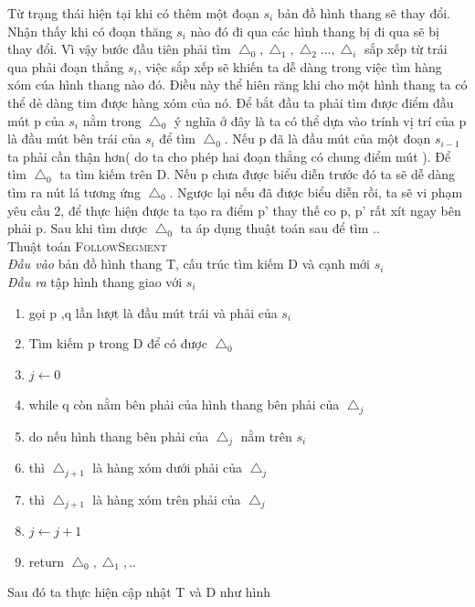 \documentclass[a4paper,12pt]{report}
\begin{document}
Từ trạng thái hiện tại khi có thêm một đoạn $s_i$ bản đồ hình thang sẽ thay đổi.
 Nhận thấy khi có đoạn thăng $s_i$ nào đó đi qua các hình thang bị đi qua sẽ bị thay đổi. Vì vậy bước đầu tiên phải tìm $\bigtriangleup_0,\bigtriangleup_1, \bigtriangleup_2..., \bigtriangleup_i $ sắp xếp từ trái qua phải đoạn thẳng $s_i$, việc sắp xếp sẽ khiến ta dễ dàng trong việc tìm hàng xóm cúa hình thang nào đó. Điều này thể hiên răng khi cho một hình thang ta có thể dẻ dàng tim được hàng xóm của nó. 
Để bắt đầu ta phải tìm được điểm đầu mút p của $s_i$ nằm trong $\bigtriangleup_0$
ý nghĩa ở đây là ta có thể dựa vào trính vị trí của p là đầu mút bên trái của $s_i$ để tìm $\bigtriangleup_0$. Nếu p đã là đầu mút của một đoạn $s_{i-1}$ ta phải cần thận hơn( do ta cho phép hai đoạn thẳng có chung điểm mút ). Để tìm  $\bigtriangleup_0$ ta tìm kiếm trên D. Nếu p chưa được biểu diễn trước đó ta sẽ dễ dàng tìm ra nút lá tương ứng $\bigtriangleup_0$. Ngược lại nếu đã được biểu diễn rồi, ta sẽ vi phạm yêu cầu 2, để thực hiện được ta tạo ra điểm p' thay thế co p, p' rất xít ngay bên phải p.
Sau khi tìm dược $\bigtriangleup_0$ ta áp dụng thuật toán sau để tìm ..\\[0.6em]
Thuật toán \textsc{FollowSegment} \\
\emph{Đầu vào} bản đồ hình thang T, cấu trúc tìm kiếm D và cạnh mới $s_i$\\
\emph{Đầu ra} tập hình thang giao với $s_i$
\begin{enumerate}
\item gọi p ,q lần lượt là đầu mút trái và phải của $s_i$
\item Tìm kiếm p trong D để có được $\bigtriangleup_0$
\item $j \longleftarrow 0$
\item while q còn nằm bên phải của hình thang bên phải của $\bigtriangleup_j$ 
\item do nếu hình thang bên phải của $\bigtriangleup_j$ nằm trên $s_i$ 
\item thì  $\bigtriangleup_{j+1}$ là hàng xóm dưới phải của $\bigtriangleup_{j}$ 
\item thì  $\bigtriangleup_{j+1}$ là hàng xóm trên phải của $\bigtriangleup_{j}$ 
\item $j \longleftarrow j+1$
\item return $\bigtriangleup_0,\bigtriangleup_1,..$
\end{enumerate}
Sau đó ta thực hiện cập nhật T và D  như hình
\end{document}
